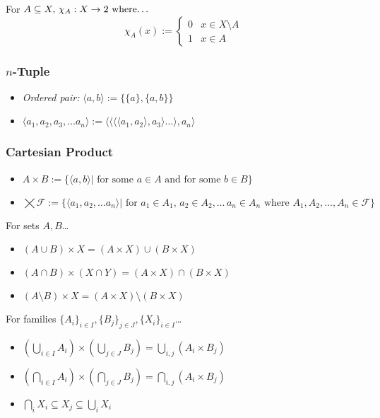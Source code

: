 \label{characteristicfucntion}
For $A \subseteq X, \, \chi_A : X \rightarrow 2 \textrm{ where\dots}$
\[\chi_A(x) := \begin{cases} 
      0 & x \in X \setminus A \\
      1 & x \in A 
   \end{cases} \]
	
\subsubsection{$n$-Tuple}\label{tuple}
\begin{itemize}
  \item \emph{Ordered pair:} $\langle a,b \rangle := \{\{a\}, \{a,b\}\}$
  \item $\langle a_1,a_2,a_3,\dots a_n \rangle := \langle \langle \langle \langle a_1, a_2 \rangle, a_3 \rangle \dots \rangle, a_n\rangle$
\end{itemize}
		
\subsubsection{Cartesian Product}\label{cartesianproduct}
\begin{itemize}
  \item $A \times B := \{ \langle a,b \rangle | \textrm{ for some }a\in A \textrm{ and for some } b \in B\}$
  \item \mbox{$\bigtimes \mathcal{F} := \{ \langle a_1,a_2, \dots a_n \rangle | \textrm{ for }a_1\in A_1, \, a_2 \in A_2, \dots \, a_n \in A_n \textrm{ where } A_1,A_2,\dots,A_n \in \mathcal{F}\}$}
\end{itemize}

\begin{proposition}
For sets $A,B$\dots
\begin{itemize}
  \item $(A \cup B) \times X = (A \times X) \cup (B \times X)$
  \item $(A \cap B) \times (X \cap Y) = (A \times X) \cap (B \times X)$
  \item $(A \setminus B) \times X = (A \times X) \setminus (B \times X)$
\end{itemize}
\end{proposition}

\begin{proposition}
For families $\{A_i\}_{i \in I},\{B_j\}_{j \in J},\{X_i\}_{i \in I}$\dots
\begin{itemize}
  \item $(\bigcup_{i \in I} A_i)\times (\bigcup_{j \in J} B_j) = \bigcup_{i,j}(A_i \times B_j)$
  \item $(\bigcap_{i \in I} A_i)\times (\bigcap_{j \in J} B_j) = \bigcap_{i,j}(A_i \times B_j)$
  \item $\bigcap_{i}X_i \subseteq X_j \subseteq \bigcup_{i}X_i$
\end{itemize}
\end{proposition}
			
